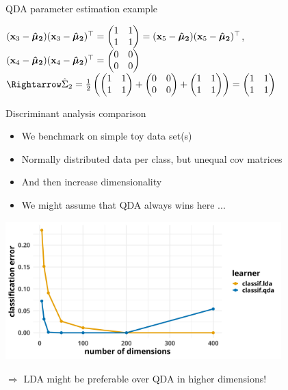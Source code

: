 \documentclass[11pt,compress,t,notes=noshow, xcolor=table]{beamer}
\begin{document}
\begin{vbframe}{QDA parameter estimation example}
\begin{small}
$(\xv_3 - \mukh[2])(\xv_3 - \mukh[2])^\top = \begin{pmatrix} 1 & 1 \\ 1 & 1 \end{pmatrix} = (\xv_5 - \mukh[2])(\xv_5 - \mukh[2])^\top$, $(\xv_4 - \mukh[2])(\xv_4 - \mukh[2])^\top = \begin{pmatrix} 0 & 0 \\ 0 & 0 \end{pmatrix}$\\
$\Rightarrow \Sigmah_2 = \frac{1}{2} \left( \begin{pmatrix} 1 & 1 \\ 1 & 1 \end{pmatrix} + \begin{pmatrix} 0 & 0 \\ 0 & 0 \end{pmatrix} + \begin{pmatrix} 1 & 1 \\ 1 & 1 \end{pmatrix} \right) = \begin{pmatrix} 1 & 1 \\ 1 & 1 \end{pmatrix}$
\end{small}
\end{vbframe}


\begin{vbframe}{Discriminant analysis comparison}
\begin{small}
\begin{itemize}
\item We benchmark on simple toy data set(s)
\item Normally distributed data per class, but unequal cov matrices
\item And then increase dimensionality
\item We might assume that QDA always wins here ...
\end{itemize}
\end{small}

\begin{center}
\includegraphics[width=0.8\textwidth, clip=true, trim={0 0 0 0}]{figure/disc_cod.png}
\end{center}

$\Rightarrow$ LDA might be preferable over QDA in higher dimensions!

\end{vbframe}
\endlecture
\end{document}
